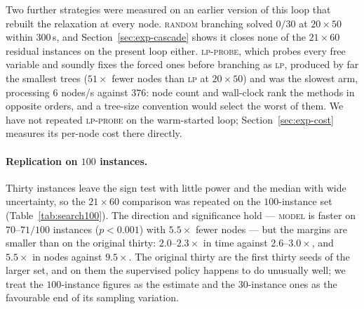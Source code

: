 \documentclass[preprint,12pt]{elsarticle}
\begin{document}
Two further strategies were measured on an earlier version of this loop that rebuilt the relaxation at every node. \textsc{random} branching solved $0/30$ at $20\times50$ within $300$\,s, and Section~\ref{sec:exp-cascade} shows it closes none of the $21\times60$ residual instances on the present loop either. \textsc{lp-probe}, which probes every free variable and soundly fixes the forced ones before branching as \textsc{lp}, produced by far the smallest trees ($51\times$ fewer nodes than \textsc{lp} at $20\times50$) and was the slowest arm, processing $6$ nodes/s against $376$: node count and wall-clock rank the methods in opposite orders, and a tree-size convention would select the worst of them. We have not repeated \textsc{lp-probe} on the warm-started loop; Section~\ref{sec:exp-cost} measures its per-node cost there directly.

\paragraph{Replication on $100$ instances.} Thirty instances leave the sign test with little power and the median with wide uncertainty, so the $21\times60$ comparison was repeated on the $100$-instance set (Table~\ref{tab:search100}). The direction and significance hold --- \textsc{model} is faster on $70$--$71/100$ instances ($p<0.001$) with $5.5\times$ fewer nodes --- but the margins are smaller than on the original thirty: $2.0$--$2.3\times$ in time against $2.6$--$3.0\times$, and $5.5\times$ in nodes against $9.5\times$. The original thirty are the first thirty seeds of the larger set, and on them the supervised policy happens to do unusually well; we treat the $100$-instance figures as the estimate and the $30$-instance ones as the favourable end of its sampling variation.

\begin{table}[h]
\centering
{}
\caption{$21\times60$, $100$ instances, lattice off, $600$\,s budget, three seeds (mean $\pm$ s.d.\ of per-seed medians; node counts are seed-invariant). The last row is the cost-aware fine-tuned policy of Section~\ref{sec:exp-rl}.}
\label{tab:search100}
\end{table}
\end{document}
